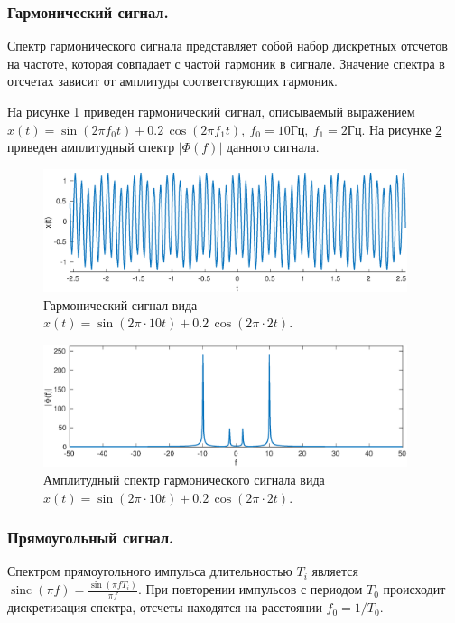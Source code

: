 \documentclass[a4paper,14pt]{extarticle}
\DeclareMathOperator{\sinc}{sinc}
\begin{document}
\subsubsection{Гармонический сигнал.}
Спектр гармонического сигнала представляет собой набор дискретных отсчетов на частоте, которая совпадает с частой гармоник в сигнале. Значение спектра в отсчетах зависит от амплитуды соответствующих гармоник. 

На рисунке \ref{sin_x} приведен гармонический сигнал, описываемый выражением $x(t) = \sin(2 \pi f_0 t) + 0.2 \, \cos(2 \pi f_1 t), ~ f_0 = 10\text{Гц}, ~ f_1 = 2\text{Гц}$. На рисунке \ref{sin_s} приведен амплитудный спектр $|\Phi(f)|$ данного сигнала.	

\begin{figure}[H]
\centering
\includegraphics[width=0.95\textwidth]{sin_x.eps}
\captionsetup{justification=centering,margin=2cm}
\caption{Гармонический сигнал вида $x(t) = \sin(2 \pi \cdot 10 t) + 0.2 \, \cos(2 \pi \cdot 2 t)$.}
\label{sin_x}
\end{figure}

\begin{figure}[H]
\centering
\includegraphics[width=0.95\textwidth]{sin_s.eps}
\captionsetup{justification=centering,margin=1cm}
\caption{Амплитудный спектр гармонического сигнала вида $x(t) = \sin(2 \pi \cdot 10 t) + 0.2 \, \cos(2 \pi \cdot 2 t)$.}
\label{sin_s}
\end{figure}


\subsubsection{Прямоугольный сигнал.}
Спектром прямоугольного импульса длительностью $T_i$ является $\sinc(\pi f)=\frac{\sin(\pi f T_i)}{\pi f}$. При повторении импульсов с периодом $T_0$ происходит дискретизация спектра, отсчеты находятся на расстоянии $f_0 = 1/T_0$. 
\end{document}
